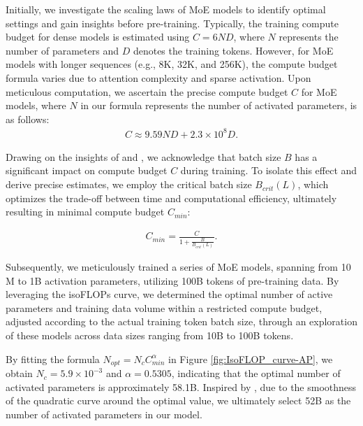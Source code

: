 \documentclass{article}
\begin{document}
Initially, we investigate the scaling laws of MoE models to identify optimal settings and gain insights before pre-training. Typically, the training compute budget for dense models is estimated using $C = 6ND$, where $N$ represents the number of parameters and $D$ denotes the training tokens. However, for MoE models with longer sequences (e.g., 8K, 32K, and 256K), the compute budget formula varies due to attention complexity and sparse activation. Upon meticulous computation, we ascertain the precise compute budget $C$ for MoE models, where $N$ in our formula represents the number of activated parameters, is as follows:
\begin{equation}
\begin{split}
C \approx 9.59 ND + 2.3 \times 10^8 D.
\end{split}
\end{equation}

Drawing on the insights of \citet{kaplan2020scaling} and \citet{li2024surge}, we acknowledge that batch size $B$ has a significant impact on compute budget $C$ during training. To isolate this effect and derive precise estimates, we employ the critical batch size $B_{crit}(L)$, which optimizes the trade-off between time and computational efficiency, ultimately resulting in minimal compute budget $C_{min}$:

\begin{equation}
\begin{split}
C_{min} = \frac{C}{1 + \frac{B}{B_{crit}(L)}}.
\end{split}
\end{equation}

Subsequently, we meticulously trained a series of MoE models, spanning from 10 M to 1B activation parameters, utilizing 100B tokens of pre-training data. By leveraging the isoFLOPs \citep{hoffmann2022training} curve, we determined the optimal number of active parameters and training data volume within a restricted compute budget, adjusted according to the actual training token batch size, through an exploration of these models across data sizes ranging from 10B to 100B tokens.

By fitting the formula $N_{opt} = N_c C_{min}^\alpha$ in Figure \ref{fig:IsoFLOP_curve-AP}, we obtain $N_c = 5.9 \times 10^{-3}$ and $\alpha = 0.5305$, indicating that the optimal number of activated parameters is approximately 58.1B. Inspired by \citet{dubey2024llama}, due to the smoothness of the quadratic curve around the optimal value, we ultimately select 52B as the number of activated parameters in our model.
\end{document}
